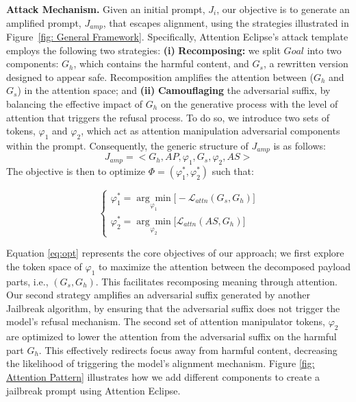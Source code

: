 \noindent \textbf{Attack Mechanism.} 
Given an initial prompt, $J_{i}$, our objective is to generate an amplified prompt, $J_{amp}$, that escapes alignment, using the strategies illustrated in Figure~\ref{fig: General Framework}.
Specifically, Attention Eclipse's attack template employs the following two strategies: \textbf{(i)} \textbf{Recomposing:} we split $Goal$ into two components: $G_h$, which contains the harmful content, and $G_s$, a rewritten version designed to appear safe.  Recomposition amplifies the attention between ($G_h$ and $G_s$) in the attention space; and \textbf{(ii)} \textbf{Camouflaging} the adversarial suffix, by balancing the effective impact of $G_h$ on the generative process with the level of attention that triggers the refusal process. 
To do so, we introduce two sets of tokens, $\varphi_1$ and $\varphi_2$, which act as attention manipulation adversarial components within the prompt.  Consequently, the generic structure of $J_{amp}$ is as follows:
\begin{equation}
    J_{amp} = <G_h, AP, \varphi_1, G_s, \varphi_2, AS>
\end{equation}
The objective is then to optimize $\Phi = (\varphi_1^*, \varphi_2^*)$ such that: 

\begin{equation}\label{eq:opt}
\begin{cases}
    \varphi^*_1 = \underset{\varphi_1}{\arg\min}\big[ - \mathcal{L}_{attn}(G_s, G_h) \big] \\
    \varphi^*_2 = \underset{\varphi_2}{\arg\min}\big[ \mathcal{L}_{attn}(AS, G_h) \big] 
\end{cases}
\end{equation}

 Equation \ref{eq:opt} represents the core objectives of our approach; we first explore the token space of $\varphi_1$ to maximize the attention between the decomposed payload parts, i.e., $(G_s, G_h)$. This facilitates recomposing meaning through attention. Our second strategy amplifies an adversarial suffix generated by another Jailbreak algorithm, by ensuring that the adversarial suffix does not trigger the model’s refusal mechanism.
The second set of attention manipulator tokens, $\varphi_{2}$ are optimized to lower the attention from the adversarial suffix on the harmful part $G_h$. This effectively redirects focus away from harmful content, decreasing the likelihood of triggering the model’s alignment mechanism. Figure \ref{fig: Attention Pattern} illustrates how we add different components to create a jailbreak prompt using Attention Eclipse.

